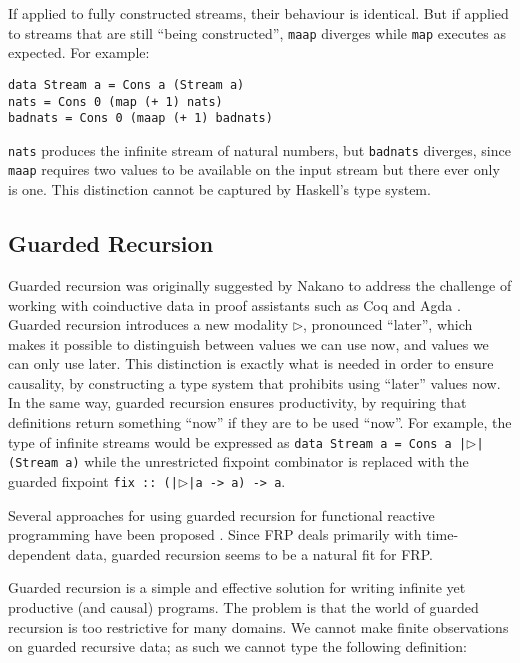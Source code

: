\documentclass[sigplan,9pt,review]{acmart}\settopmatter{printfolios=true,printccs=false,printacmref=false}
\newcommand{\code}[1]{\texttt{#1}}
\begin{document}
If applied to fully constructed streams, their behaviour is identical. But if applied to
streams that are still ``being constructed'', \code{maap} diverges while \code{map} executes
as expected. For example:

\begin{verbatim}
data Stream a = Cons a (Stream a)
nats = Cons 0 (map (+ 1) nats)
badnats = Cons 0 (maap (+ 1) badnats)
\end{verbatim}

\code{nats} produces the infinite stream of natural numbers, but \code{badnats} diverges,
since \code{maap} requires two values to be available on the input stream but there ever
only is one. This distinction cannot be captured by Haskell's type system.

\subsection{Guarded Recursion}\label{sec:guarded-recursion}
Guarded recursion was originally suggested by Nakano \cite{nakano2000modality}
to address the challenge of working with coinductive data in proof assistants such as
Coq \cite{coq} and Agda \cite{norell2007towards}.
Guarded recursion introduces a new modality $\rhd$, pronounced ``later'',
which makes it possible to distinguish between values we can use now, and
values we can only use later.
This distinction is exactly what is needed in order to ensure
causality, by constructing a type system that prohibits using ``later'' values
now. In the same way, guarded recursion ensures productivity, by requiring that
definitions return something ``now'' if they are to be used ``now''.
For example, the type of infinite streams would be expressed as \newline
\texttt
{data Stream a = Cons a |$\rhd$|(Stream a)} while the unrestricted fixpoint combinator
is replaced with the guarded fixpoint
\texttt{fix :: (|$\rhd$|a -> a) -> a}.

Several approaches for using guarded recursion for functional reactive programming have been
proposed \cite{krishnaswami2011ultrametric,cave2014fair,simple-frp}. Since FRP deals primarily
with time-dependent data, guarded recursion seems to be a natural fit for FRP.

Guarded recursion is a simple and effective solution for writing infinite yet productive (and causal)
programs. The problem is that the world of guarded recursion is too restrictive for many domains.
We cannot make finite observations on guarded recursive data; as such we cannot type the following
definition:
\end{document}
